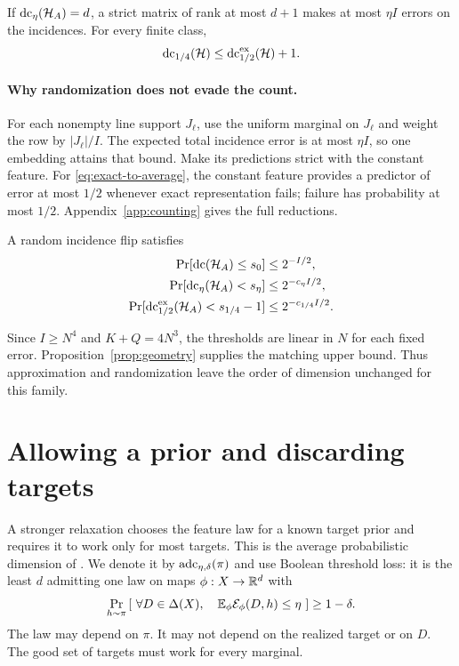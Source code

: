 \begin{lemma}\label{lem:prob-reduction}
If $\operatorname{dc}_\eta(\mathcal H_A)=d$, a strict matrix of rank at most $d+1$ makes at most $\eta I$ errors on the incidences. For every finite class,
\begin{equation}
 \operatorname{dc}_{1/4}(\mathcal H)\le\operatorname{dc}^{\mathrm{ex}}_{1/2}(\mathcal H)+1.
 \label{eq:exact-to-average}
\end{equation}
\end{lemma}

\paragraph{Why randomization does not evade the count.}
For each nonempty line support $J_\ell$, use the uniform marginal on $J_\ell$ and weight the row by $|J_\ell|/I$. The expected total incidence error is at most $\eta I$, so one embedding attains that bound. Make its predictions strict with the constant feature. For \eqref{eq:exact-to-average}, the constant feature provides a predictor of error at most $1/2$ whenever exact representation fails; failure has probability at most $1/2$. Appendix~\ref{app:counting} gives the full reductions.

\begin{theorem}\label{thm:dimensions}
A random incidence flip satisfies
\begin{align}
 \Pr[\operatorname{dc}(\mathcal H_A)\le s_0]&\le2^{-I/2},\label{eq:ordinaryprob}\\
 \Pr[\operatorname{dc}_\eta(\mathcal H_A)<s_\eta]&\le2^{-c_\eta I/2},\label{eq:averageprob}\\
 \Pr[\operatorname{dc}^{\mathrm{ex}}_{1/2}(\mathcal H_A)<s_{1/4}-1]&\le2^{-c_{1/4}I/2}.
 \label{eq:exactprob-bound}
\end{align}
\end{theorem}

Since $I\ge N^4$ and $K+Q=4N^3$, the thresholds are linear in $N$ for each fixed error. Proposition~\ref{prop:geometry} supplies the matching upper bound. Thus approximation and randomization leave the order of dimension unchanged for this family.

\section{Allowing a prior and discarding targets}\label{sec:prior}
A stronger relaxation chooses the feature law for a known target prior and requires it to work only for most targets. This is the average probabilistic dimension of \citet[Definition~3.2]{KM25}. We denote it by $\operatorname{adc}_{\eta,\delta}(\pi)$ and use Boolean threshold loss: it is the least $d$ admitting one law on maps $\phi:X\to\mathbb R^d$ with
\begin{equation}
 \Pr_{h\sim\pi}\left[\ \forall D\in\Delta(X),\quad
       \mathbb E_\phi\mathcal E_\phi(D,h)\le\eta\ \right]\ge1-\delta.
 \label{eq:adcdef}
\end{equation}
The law may depend on $\pi$. It may not depend on the realized target or on $D$. The good set of targets must work for every marginal.

